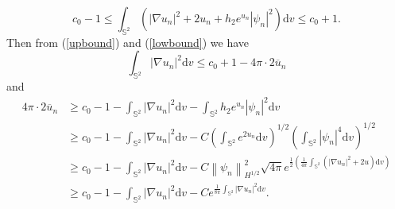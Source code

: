 \documentclass[a4paper, 12pt]{article}
\begin{document}
\begin{equation}\label{lowbound}
	c_0 - 1 \leq \int_{{\mathbb{S}^2}} {\left( {{{\left| {\nabla u_n} \right|}^2} + 2u_n + {h_2}{e^{u_n}}{{\left| \psi_n  \right|}^2}} \right)}{\text{d}{v}}  \leq c_0 + 1.
\end{equation}
Then from (\ref{upbound}) and (\ref{lowbound}) we have \begin{equation*}\int_{{\mathbb{S}^2}} {{{\left| {\nabla u_n} \right|}^2}{\text{d}{v}}}  \leq c_0 + 1 - 4\pi \cdot 2 {\overline u _n}
\end{equation*} and
\begin{equation}\label{4.1}
	\begin{aligned}
		4\pi  \cdot 2{\overline u _n} &\geq c_0 - 1 - \int_{{\mathbb{S}^2}} {{{\left| {\nabla {u_n}} \right|}^2}}{\text{d}{v}}  - \int_{{\mathbb{S}^2}}{h_2} {{e^{{u_n}}}{{\left| {{\psi _n}} \right|}^2}} {\text{d}{v}}  \\
		&\geq c_0 - 1 - \int_{{\mathbb{S}^2}} {{{\left| {\nabla {u_n}} \right|}^2}}{\text{d}{v}}  - C{\left( {\int_{{\mathbb{S}^2}} {{e^{2{u_n}}}} }{\text{d}{v}} \right)^{1/2}}{\left( {\int_{{\mathbb{S}^2}} {{{\left| {{\psi _n}} \right|}^4}} {\text{d}{v}}} \right)^{1/2}}  \\
		&\geq c_0 - 1 - \int_{{\mathbb{S}^2}} {{{\left| {\nabla {u_n}} \right|}^2}} {\text{d}{v}} - C\left\| {{\psi _n}} \right\|_{H^{1/2}}^2\sqrt {4\pi } {e^{\frac{1}{2}\left( {\frac{1}{{4\pi }}\int_{{\mathbb{S}^2}} {\left( {{{\left| {\nabla {u_n}} \right|}^2} + 2u} \right){\text{d}{v}}} } \right)}}  \\
		&\geq c_0 - 1 - \int_{{\mathbb{S}^2}} {{{\left| {\nabla {u_n}} \right|}^2}{\text{d}{v}}}  - C{e^{\frac{1}{{8\pi }}\int_{{\mathbb{S}^2}} {{{\left| {\nabla {u_n}} \right|}^2}} {\text{d}{v}}}} .
	\end{aligned}
\end{equation}
\end{document}
